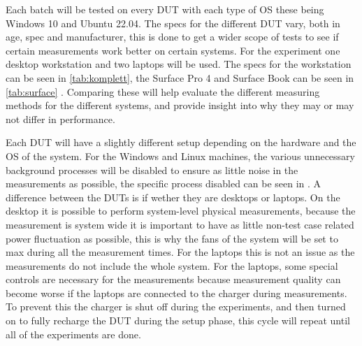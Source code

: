 Each batch will be tested on every DUT with each type of OS these being Windows 10 and Ubuntu 22.04.
The specs for the different DUT vary, both in age, spec and manufacturer, this is done to get a wider scope of tests to see if certain measurements work better on certain systems. For the experiment one desktop workstation and two laptops will be used. The specs for the workstation can be seen in \cref{tab:komplett}, the Surface Pro 4 and Surface Book can be seen in \cref{tab:surface} . Comparing these will help evaluate the different measuring methods for the different systems, and provide insight into why they may or may not differ in performance.




Each DUT will have a slightly different setup depending on the hardware and the OS of the system. For the Windows and Linux machines, the various unnecessary background processes will be disabled to ensure as little noise in the measurements as possible\cite*[]{sestoft2013microbenchmarks}, the specific process disabled can be seen in . A difference between the DUTs is if wether they are desktops or laptops. On the desktop it is possible to perform system-level physical measurements, because the measurement is system wide it is important to have as little non-test case related power fluctuation as possible, this is why the fans of the system will be set to max during all the measurement times. For the laptops this is not an issue as the measurements do not include the whole system. For the laptops, some special controls are necessary for the measurements because measurement quality can become worse if the laptops are connected to the charger during measurements\cite{E3Video}. To prevent this the charger is shut off during the experiments, and then turned on to fully recharge the DUT during the setup phase, this cycle will repeat until all of the experiments are done.
